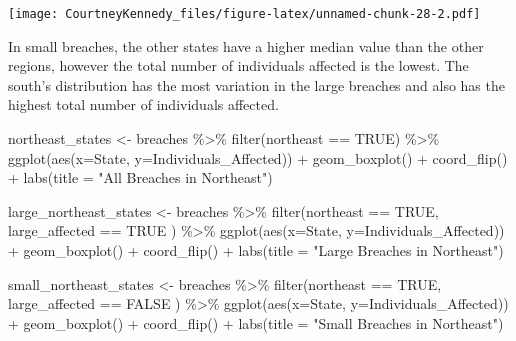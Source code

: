 \documentclass[
]{article}
\newenvironment{Shaded}{\begin{snugshade}}{\end{snugshade}}
\newcommand{\AttributeTok}[1]{\textcolor[rgb]{0.77,0.63,0.00}{#1}}
\newcommand{\ConstantTok}[1]{\textcolor[rgb]{0.00,0.00,0.00}{#1}}
\newcommand{\FunctionTok}[1]{\textcolor[rgb]{0.00,0.00,0.00}{#1}}
\newcommand{\NormalTok}[1]{#1}
\newcommand{\OtherTok}[1]{\textcolor[rgb]{0.56,0.35,0.01}{#1}}
\newcommand{\SpecialCharTok}[1]{\textcolor[rgb]{0.00,0.00,0.00}{#1}}
\newcommand{\StringTok}[1]{\textcolor[rgb]{0.31,0.60,0.02}{#1}}
\begin{document}
\texttt{[image: CourtneyKennedy\_files/figure-latex/unnamed-chunk-28-2.pdf]}

In small breaches, the other states have a higher median value than the
other regions, however the total number of individuals affected is the
lowest. The south's distribution has the most variation in the large
breaches and also has the highest total number of individuals affected.

\begin{Shaded}
\begin{Highlighting}[]
\NormalTok{northeast\_states }\OtherTok{\textless{}{-}}\NormalTok{ breaches }\SpecialCharTok{\%\textgreater{}\%}
  \FunctionTok{filter}\NormalTok{(northeast }\SpecialCharTok{==} \ConstantTok{TRUE}\NormalTok{) }\SpecialCharTok{\%\textgreater{}\%}
  \FunctionTok{ggplot}\NormalTok{(}\FunctionTok{aes}\NormalTok{(}\AttributeTok{x=}\NormalTok{State, }\AttributeTok{y=}\NormalTok{Individuals\_Affected)) }\SpecialCharTok{+}
  \FunctionTok{geom\_boxplot}\NormalTok{() }\SpecialCharTok{+} 
  \FunctionTok{coord\_flip}\NormalTok{() }\SpecialCharTok{+}
  \FunctionTok{labs}\NormalTok{(}\AttributeTok{title =} \StringTok{"All Breaches in Northeast"}\NormalTok{)}

\NormalTok{large\_northeast\_states }\OtherTok{\textless{}{-}}\NormalTok{ breaches }\SpecialCharTok{\%\textgreater{}\%}
  \FunctionTok{filter}\NormalTok{(northeast }\SpecialCharTok{==} \ConstantTok{TRUE}\NormalTok{, large\_affected }\SpecialCharTok{==} \ConstantTok{TRUE}\NormalTok{ ) }\SpecialCharTok{\%\textgreater{}\%}
  \FunctionTok{ggplot}\NormalTok{(}\FunctionTok{aes}\NormalTok{(}\AttributeTok{x=}\NormalTok{State, }\AttributeTok{y=}\NormalTok{Individuals\_Affected)) }\SpecialCharTok{+}
  \FunctionTok{geom\_boxplot}\NormalTok{() }\SpecialCharTok{+} 
  \FunctionTok{coord\_flip}\NormalTok{() }\SpecialCharTok{+}
  \FunctionTok{labs}\NormalTok{(}\AttributeTok{title =} \StringTok{"Large Breaches in Northeast"}\NormalTok{)}

\NormalTok{small\_northeast\_states }\OtherTok{\textless{}{-}}\NormalTok{ breaches }\SpecialCharTok{\%\textgreater{}\%}
  \FunctionTok{filter}\NormalTok{(northeast }\SpecialCharTok{==} \ConstantTok{TRUE}\NormalTok{, large\_affected }\SpecialCharTok{==} \ConstantTok{FALSE}\NormalTok{ ) }\SpecialCharTok{\%\textgreater{}\%}
  \FunctionTok{ggplot}\NormalTok{(}\FunctionTok{aes}\NormalTok{(}\AttributeTok{x=}\NormalTok{State, }\AttributeTok{y=}\NormalTok{Individuals\_Affected)) }\SpecialCharTok{+}
  \FunctionTok{geom\_boxplot}\NormalTok{() }\SpecialCharTok{+} 
  \FunctionTok{coord\_flip}\NormalTok{() }\SpecialCharTok{+}
  \FunctionTok{labs}\NormalTok{(}\AttributeTok{title =} \StringTok{"Small Breaches in Northeast"}\NormalTok{)}


\end{Highlighting}
\end{Shaded}
\end{document}
